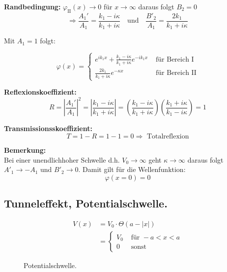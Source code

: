 \textbf{Randbedingung:} $\varphi_\textrm{II}(x) \rightarrow 0$ für $x \rightarrow \infty$
daraus folgt $B_2 = 0$ \\
\begin{equation*}
  \Rightarrow \frac{A_1'}{A_1} = \frac{k_1-i\kappa}{k_1+i\kappa} \quad
  \mbox{und} \quad
  \frac{B'_2}{A_1} = \frac{2k_1}{k_1+i\kappa}
\end{equation*}

Mit $A_1 = 1$ folgt:

\begin{equation*}
  \varphi(x) =
  \begin{cases}
    e^{ik_1x}+\frac{k_1-i\kappa}{k_1+i\kappa} e^{-ik_1x} & \mbox{ für Bereich I} \\
    \frac{2k_1}{k_1+i\kappa} e^{-\kappa x} & \mbox{ für Bereich II}
  \end{cases}
\end{equation*}

\textbf{Reflexionskoeffizient:}
  \begin{equation*}
    R= \left|\frac{A_1'}{A_1}\right|^2 
    =  \left|\frac{k_1-i\kappa}{k_1+i\kappa}\right|
    = \left(\frac{k_1-i\kappa}{k_1+i\kappa}\right) 
    \left(\frac{k_1+i\kappa}{k_1-i\kappa}\right)
    = 1
  \end{equation*}

\textbf{Transmissionsskoeffizient:}
\begin{equation*}
  T= 1-R = 1-1=0 \Rightarrow \mbox{ Totalreflexion}
\end{equation*}

\textbf{Bemerkung:}\\
Bei einer unendlichhoher Schwelle d.h. $V_0 \rightarrow \infty$ geht $\kappa
\rightarrow \infty$ daraus folgt $A'_1 \rightarrow -A_1$ und $B'_2 \rightarrow
0$. Damit gilt für die Wellenfunktion:
\[ \varphi(x=0)=0 \]

\subsection{Tunneleffekt, Potentialschwelle.}
\begin{figure}[htbp]
  \begin{minipage}[h]{0.45\linewidth}
    \begin{align*}
      V(x)&=V_0\cdot\Theta(a-|x|) \\
      &= \begin{cases}
        V_0 & \mbox{ für }-a<x<a\\
        0 & \mbox{ sonst}
      \end{cases}
    \end{align*}
    \vspace{1cm}
  \end{minipage}
  \hfill
  \begin{minipage}[h]{0.5\linewidth}
    
  \end{minipage}
  \caption{Potentialschwelle.}
  \label{fig:6}
\end{figure}


